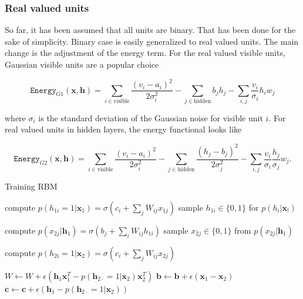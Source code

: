 \subsubsection{Real valued units}

So far, it has been assumed that all units are binary. That has been done for the sake of simplicity. Binary case is easily generalized to real valued units. The main change is the adjustment of the energy term. For the real valued visible units, Gaussian visible units are a popular choice

\begin{equation}
	\mathtt{Energy}_{G1}(\mathbf{x}, \mathbf{h}) = \sum_{i \in \text{visible}}\frac{(v_i - a_i)^2}{2\sigma_i^2} - \sum_{j \in \text{hidden}} b_jh_j - \sum_{i,j}\frac{v_i}{\sigma_i}h_iw_j
\end{equation}

where $\sigma_i$ is the standard deviation of the Gaussian noise for visible unit $i$. For real valued units in hidden layers, the energy functional looks like

\begin{equation}
	\mathtt{Energy}_{G2}(\mathbf{x}, \mathbf{h}) = \sum_{i \in \text{visible}}\frac{(v_i - a_i)^2}{2\sigma_i^2} - \sum_{j \in \text{hidden}} \frac{(h_j - b_j)^2}{2\sigma_j^2} - \sum_{i,j}\frac{v_i}{\sigma_i}\frac{h_j}{\sigma_j}w_j.
\end{equation}




\begin{algorithm}
	\caption{Training RBM}
	\label{alg:RBM}
	\begin{algorithmic}[1]
		\Repeat
				\State compute $p(h_{1i}=1|\mathbf{x}_1) = \sigma \left ( c_i + \sum_jW_{ij}x_{1j}  \right )$
				\State sample $h_{1i} \in \{ 0,1 \}$ for $p(h_i|\mathbf{x}_!)$
			\EndFor
			
				\State compute $p(x_{2j}|\mathbf{h}_1) = \sigma \left ( b_j + \sum_iW_{ij}h_{1i} \right )$
				\State sample $x_{2j} \in \{ 0,1 \}$ from $p(x_{2j}|\mathbf{h}_1)$
			\EndFor
			
				\State compute $p(h_{2i}=1|\mathbf{x}_2) = \sigma \left ( c_i + \sum_jW_{ij}x_{2j}  \right )$
			\EndFor
			
			\State $W \gets W + \epsilon \left ( \mathbf{h}_1 \mathbf{x}_1^T - p(\mathbf{h}_{2\cdot} = 1|\mathbf{x}_2)\mathbf{x}_2^T\right )$
			\State $\mathbf{b} \gets \mathbf{b} + \epsilon ( \mathbf{x}_1 - \mathbf{x}_2  )$
			\State $\mathbf{c} \gets \mathbf{c} + \epsilon (\mathbf{h}_1 -  p(\mathbf{h}_{2\cdot} = 1|\mathbf{x}_2))$
		\EndFunction
	\end{algorithmic}
\end{algorithm}

